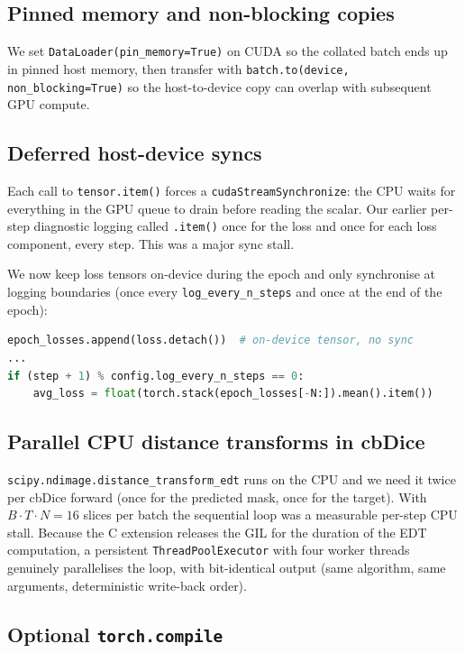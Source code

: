 \documentclass[11pt,a4paper]{article}
\begin{document}
\subsection{Pinned memory and non-blocking copies}

We set \texttt{DataLoader(pin\_memory=True)} on CUDA so the collated
batch ends up in pinned host memory, then transfer with
\texttt{batch.to(device, non\_blocking=True)} so the host-to-device
copy can overlap with subsequent GPU compute.

\subsection{Deferred host-device syncs}

Each call to \texttt{tensor.item()} forces a
\texttt{cudaStreamSynchronize}: the CPU waits for everything in the
GPU queue to drain before reading the scalar. Our earlier per-step
diagnostic logging called \texttt{.item()} once for the loss and once
for each loss component, every step. This was a major sync stall.

We now keep loss tensors on-device during the epoch and only
synchronise at logging boundaries (once every \texttt{log\_every\_n\_steps}
and once at the end of the epoch):
\begin{lstlisting}[language=Python]
epoch_losses.append(loss.detach())  # on-device tensor, no sync
...
if (step + 1) % config.log_every_n_steps == 0:
    avg_loss = float(torch.stack(epoch_losses[-N:]).mean().item())
\end{lstlisting}

\subsection{Parallel CPU distance transforms in cbDice}

\texttt{scipy.ndimage.distance\_transform\_edt} runs on the CPU and we
need it twice per cbDice forward (once for the predicted mask, once for
the target). With $B \cdot T \cdot N = 16$ slices per batch the sequential
loop was a measurable per-step CPU stall. Because the C extension
releases the GIL for the duration of the EDT computation, a persistent
\texttt{ThreadPoolExecutor} with four worker threads genuinely
parallelises the loop, with bit-identical output (same algorithm, same
arguments, deterministic write-back order).

\subsection{Optional \texttt{torch.compile}}
\end{document}

